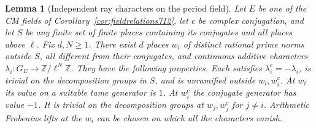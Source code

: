 \documentclass[a4paper,11pt]{article}
\newtheorem{lemma}[proposition]{Lemma}
\theoremstyle{definition}
\theoremstyle{remark}
\newcommand{\ZZ}{\mathbb Z}\newcommand{\ord}{\operatorname{ord}}
\numberwithin{equation}{section}
\begin{document}
\begin{lemma}[Independent ray characters on the period field]\leavevmode
\label{lem:raycoordinates726}
Let \(E\) be one of the CM fields of Corollary~\ref{cor:fieldrelations712},
let \(c\) be complex conjugation, and let \(S\) be any finite set of
finite places containing its conjugates and all places above \(\ell\).
Fix \(d,N\ge1\). There exist \(d\) places \(w_i\) of distinct rational
prime norms outside \(S\), all different from their conjugates, and
continuous additive characters
\(\lambda_i:G_E\to\ZZ/\ell^N\ZZ\). They have the following properties.
Each satisfies \(\lambda_i^c=-\lambda_i\), is trivial on the decomposition
groups in \(S\), and is unramified outside \(w_i,w_i^c\). At \(w_i\)
its value on a suitable tame generator is \(1\). At \(w_i^c\) the
conjugate generator has value \(-1\). It is trivial on the decomposition
groups at \(w_j,w_j^c\) for \(j\ne i\). Arithmetic Frobenius lifts at
the \(w_i\) can be chosen on which all the characters vanish.
\end{lemma}
\end{document}
